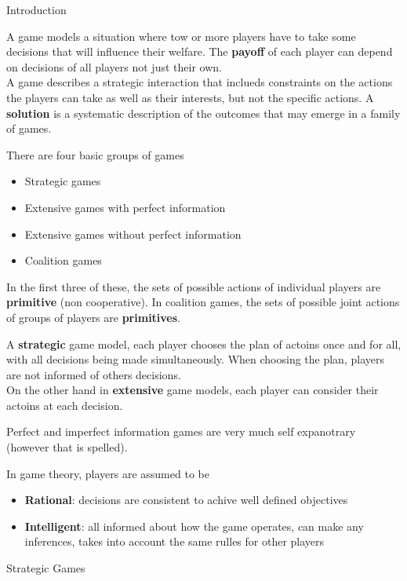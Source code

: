 \documentclass[12pt, letterpaper]{article}
\begin{document}
\begin{section}{Introduction}

  A game models a situation where tow or more players have to take some
  decisions that will influence their welfare. The \textbf{payoff} of each
  player can depend on decisions of all players not just their own. \\
  A game describes a strategic interaction that inclueds constraints on the
  actions the players can take as well as their interests, but not the specific
  actions. A \textbf{solution} is a systematic description of the outcomes that
  may emerge in a family of games.

  There are four basic groups of games
  \begin{itemize}
    \item Strategic games
    \item Extensive games with perfect information
    \item Extensive games without perfect information
    \item Coalition games
  \end{itemize}
  In the first three of these, the sets of possible actions of individual
  players are \textbf{primitive} (non cooperative). In coalition games, the
  sets of possible joint actions of groups of players are \textbf{primitives}.

  A \textbf{strategic} game model, each player chooses the plan of actoins once
  and for all, with all decisions being made simultaneously. When choosing the
  plan, players are not informed of others decisions. \\
  On the other hand in \textbf{extensive} game models, each player can consider
  their actoins at each decision.

  Perfect and imperfect information games are very much self expanotrary
  (however that is spelled).

  In game theory, players are assumed to be
  \begin{itemize}
    \item \textbf{Rational}: decisions are consistent to achive well defined
          objectives
    \item \textbf{Intelligent}: all informed about how the game operates,
          can make any inferences, takes into account the same rulles for other
          players
  \end{itemize}

  \begin{subsection}{Strategic Games}


\end{subsection}
\end{section}
\end{document}
